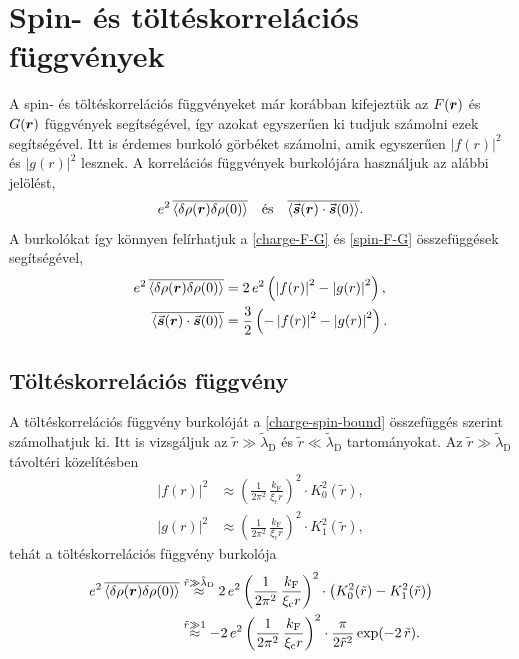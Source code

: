 \documentclass[a4paper,12pt,titlepage]{article}
\newcommand{\RR}{{\vb*{r}}}
\newcommand{\kF}{{k_\text{F}}}
\begin{document}
\section{Spin- és töltéskorrelációs függvények}

A spin- és töltéskorrelációs függvényeket már korábban kifejeztük az $F(\RR)$ és $G(\RR)$ függvények segítségével, így azokat egyszerűen ki tudjuk számolni ezek segítségével.  Itt is érdemes burkoló görbéket számolni, amik egyszerűen $\left| f(r) \right|^2$ és $\left| g(r) \right|^2$ lesznek.  A korrelációs függvények burkolójára használjuk az alábbi jelölést,
\begin{equation}
	e^2 \, \overline{\expval{\delta\rho(\RR) \delta\rho(0)}} ~~~ \text{és} ~~~ \overline{\expval{\va*{s}(\RR) \cdot \va*{s}(0)}}.
\end{equation}
A burkolókat így könnyen felírhatjuk a \eqref{charge-F-G} és \eqref{spin-F-G} összefüggések segítségével,
\begin{equation} \label{charge-spin-bound}
\begin{split}
	e^2 \, \overline{\expval{\delta\rho(\RR) \delta\rho(0)}} & = 2 \, e^2 \left( \left| f(r) \right|^2 - \left| g(r) \right|^2 \right), \\
	\overline{\expval{\va*{s}(\RR) \cdot \va*{s}(0)}} & = \frac{3}{2} \left( -\left| f(r) \right|^2 - \left| g(r) \right|^2 \right).
\end{split}
\end{equation}


\subsection{Töltéskorrelációs függvény}

A töltéskorrelációs függvény burkolóját a \eqref{charge-spin-bound} összefüggés szerint számolhatjuk ki.  Itt is vizsgáljuk az $\tilde{r} \gg \tilde{\lambda}_\text{D}$ és $\tilde{r} \ll \tilde{\lambda}_\text{D}$ tartományokat.  Az $\tilde{r} \gg \tilde{\lambda}_\text{D}$ távoltéri közelítésben
\begin{equation} \label{f2-g2-far}
\begin{split}
	\left| f(r) \right|^2 & \approx \left( \frac{1}{2 \pi^2} \, \frac{\kF}{\xi_\text{c} r} \right)^2 \cdot K_0^2(\tilde{r}), \\
	\left| g(r) \right|^2 & \approx \left( \frac{1}{2 \pi^2} \, \frac{\kF}{\xi_\text{c} r} \right)^2 \cdot K_1^2(\tilde{r}),
\end{split}
\end{equation}
tehát a töltéskorrelációs függvény burkolója
\begin{equation}
\begin{split}
	e^2 \, \overline{\expval{\delta\rho(\RR) \delta\rho(0)}} & \stackrel{\tilde{r} \gg \tilde{\lambda}_\text{D}}{\approx} 2 \, e^2 \left( \frac{1}{2 \pi^2} \, \frac{\kF}{\xi_\text{c} r} \right)^2 \cdot \left( K_0^2(\tilde{r}) - K_1^2(\tilde{r}) \right) \\
	& \stackrel{\tilde{r} \gg 1}{\approx} -2 \, e^2 \left( \frac{1}{2 \pi^2} \, \frac{\kF}{\xi_\text{c} r} \right)^2 \cdot  \frac{\pi}{2 \tilde{r}^2} \exp(-2 \, \tilde{r}).
\end{split}
\end{equation}
\end{document}
